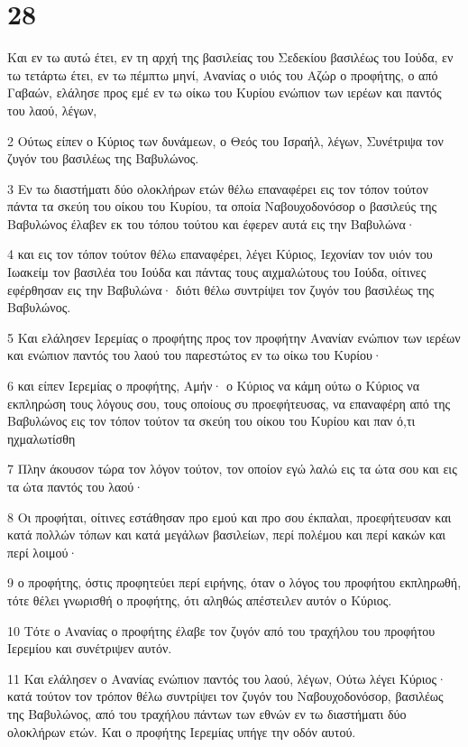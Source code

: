 \chapter{28}

\par Και εν τω αυτώ έτει, εν τη αρχή της βασιλείας του Σεδεκίου βασιλέως του Ιούδα, εν τω τετάρτω έτει, εν τω πέμπτω μηνί, Ανανίας ο υιός του Αζώρ ο προφήτης, ο από Γαβαών, ελάλησε προς εμέ εν τω οίκω του Κυρίου ενώπιον των ιερέων και παντός του λαού, λέγων,
\par 2 Ούτως είπεν ο Κύριος των δυνάμεων, ο Θεός του Ισραήλ, λέγων, Συνέτριψα τον ζυγόν του βασιλέως της Βαβυλώνος.
\par 3 Εν τω διαστήματι δύο ολοκλήρων ετών θέλω επαναφέρει εις τον τόπον τούτον πάντα τα σκεύη του οίκου του Κυρίου, τα οποία Ναβουχοδονόσορ ο βασιλεύς της Βαβυλώνος έλαβεν εκ του τόπου τούτου και έφερεν αυτά εις την Βαβυλώνα·
\par 4 και εις τον τόπον τούτον θέλω επαναφέρει, λέγει Κύριος, Ιεχονίαν τον υιόν του Ιωακείμ τον βασιλέα του Ιούδα και πάντας τους αιχμαλώτους του Ιούδα, οίτινες εφέρθησαν εις την Βαβυλώνα· διότι θέλω συντρίψει τον ζυγόν του βασιλέως της Βαβυλώνος.
\par 5 Και ελάλησεν Ιερεμίας ο προφήτης προς τον προφήτην Ανανίαν ενώπιον των ιερέων και ενώπιον παντός του λαού του παρεστώτος εν τω οίκω του Κυρίου·
\par 6 και είπεν Ιερεμίας ο προφήτης, Αμήν· ο Κύριος να κάμη ούτω ο Κύριος να εκπληρώση τους λόγους σου, τους οποίους συ προεφήτευσας, να επαναφέρη από της Βαβυλώνος εις τον τόπον τούτον τα σκεύη του οίκου του Κυρίου και παν ό,τι ηχμαλωτίσθη
\par 7 Πλην άκουσον τώρα τον λόγον τούτον, τον οποίον εγώ λαλώ εις τα ώτα σου και εις τα ώτα παντός του λαού·
\par 8 Οι προφήται, οίτινες εστάθησαν προ εμού και προ σου έκπαλαι, προεφήτευσαν και κατά πολλών τόπων και κατά μεγάλων βασιλείων, περί πολέμου και περί κακών και περί λοιμού·
\par 9 ο προφήτης, όστις προφητεύει περί ειρήνης, όταν ο λόγος του προφήτου εκπληρωθή, τότε θέλει γνωρισθή ο προφήτης, ότι αληθώς απέστειλεν αυτόν ο Κύριος.
\par 10 Τότε ο Ανανίας ο προφήτης έλαβε τον ζυγόν από του τραχήλου του προφήτου Ιερεμίου και συνέτριψεν αυτόν.
\par 11 Και ελάλησεν ο Ανανίας ενώπιον παντός του λαού, λέγων, Ούτω λέγει Κύριος· κατά τούτον τον τρόπον θέλω συντρίψει τον ζυγόν του Ναβουχοδονόσορ, βασιλέως της Βαβυλώνος, από του τραχήλου πάντων των εθνών εν τω διαστήματι δύο ολοκλήρων ετών. Και ο προφήτης Ιερεμίας υπήγε την οδόν αυτού.
